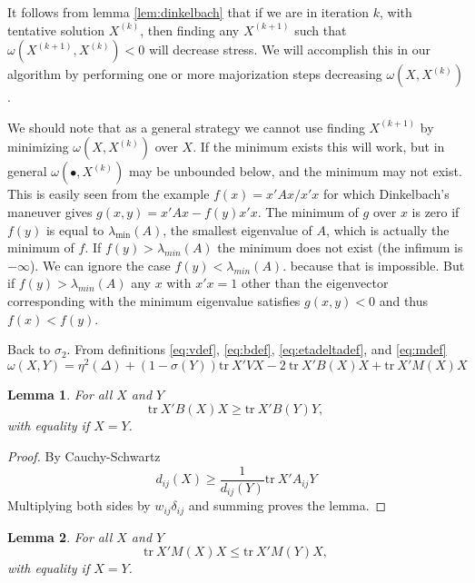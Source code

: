 \documentclass[
  12pt,
]{article}
\newtheorem{lemma}{Lemma}[section]
\theoremstyle{definition}
\theoremstyle{definition}
\theoremstyle{definition}
\theoremstyle{definition}
\theoremstyle{remark}
\begin{document}
It follows from lemma \ref{lem:dinkelbach} that if we are in iteration \(k\), with tentative solution \(X^{(k)}\), then finding any \(X^{(k+1)}\) such that
\(\omega(X^{(k+1)},X^{(k)})<0\) will decrease stress. We will accomplish this
in our algorithm by performing one or more majorization steps decreasing
\(\omega(X,X^{(k)})\).

We should note that as a general strategy we cannot use finding \(X^{(k+1)}\)
by minimizing \(\omega(X,X^{(k)})\) over \(X\). If the minimum exists this will
work, but in general \(\omega(\bullet,X^{(k)})\) may be unbounded below, and
the minimum may not exist. This is easily seen from the example \(f(x)=x'Ax/x'x\)
for which Dinkelbach's maneuver gives \(g(x,y)=x'Ax-f(y)x'x\). The minimum
of \(g\) over \(x\) is zero if \(f(y)\) is equal to \(\lambda_{\min}(A)\), the smallest eigenvalue
of \(A\), which is actually the minimum of \(f\). If \(f(y)>\lambda_{min}(A)\) the minimum
does not exist (the infimum is \(-\infty\)). We can ignore the case \(f(y)<\lambda_{min}(A)\).
because that is impossible. But if \(f(y)>\lambda_{min}(A)\) any \(x\) with \(x'x=1\) other than
the eigenvector corresponding with the minimum eigenvalue satisfies \(g(x,y)<0\)
and thus \(f(x)<f(y)\).

Back to \(\sigma_2\). From definitions \eqref{eq:vdef}, \eqref{eq:bdef}, \eqref{eq:etadeltadef}, and \eqref{eq:mdef}
\begin{equation}
\omega(X,Y)=\eta^2(\Delta)+(1-\sigma(Y))\text{tr}\ X'VX-2\ \text{tr}\ X'B(X)X+\text{tr}\ X'M(X)X
\label{eq:omegasimple}
\end{equation}

\begin{lemma}
\protect\hypertarget{lem:smacof}{}\label{lem:smacof}For all \(X\) and \(Y\)
\begin{equation}
\text{tr}\ X'B(X)X\geq\text{tr}\ X'B(Y)Y,
\label{eq:smacof}
\end{equation}
with equality if \(X=Y\).
\end{lemma}

\begin{proof}
By Cauchy-Schwartz
\begin{equation}
d_{ij}(X)\geq\frac{1}{d_{ij}(Y)}\text{tr}\ X'A_{ij}Y
\label{eq:cs1}
\end{equation}
Multiplying both sides by \(w_{ij}\delta_{ij}\) and summing proves the lemma.
\end{proof}

\begin{lemma}
\protect\hypertarget{lem:neweq}{}\label{lem:neweq}For all \(X\) and \(Y\)
\begin{equation}
\text{tr}\ X'M(X)X\leq\text{tr}\ X'M(Y)X,
\label{eq:secineq}
\end{equation}
with equality if \(X=Y\).
\end{lemma}
\end{document}
